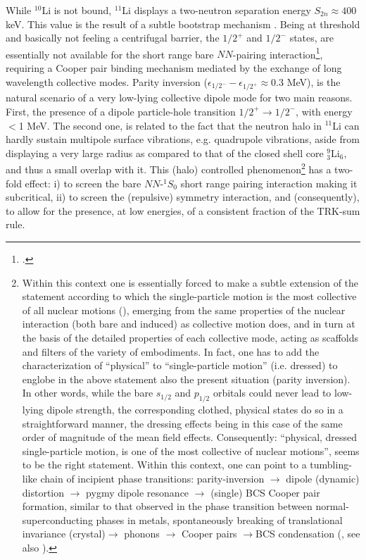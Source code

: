 While $^{10}$Li is not bound, $^{11}$Li displays a two-neutron separation energy $S_{2n}\approx400$ keV.  This value  is the result of a subtle bootstrap mechanism 
. Being at threshold and basically not feeling a centrifugal barrier, the $1/2^+$ and $1/2^-$ states, are essentially not available for the short range bare $NN$-pairing interaction\footnote{\cite{Bennaceur:00,Hamamoto:03,Hamamoto:04}.}, requiring a Cooper pair binding mechanism mediated by  the exchange of  long wavelength collective modes. Parity inversion ($\epsilon_{1/2^-}-\epsilon_{1/2^+}\approx0.3$ MeV), is the natural scenario of a very low-lying collective dipole mode for two main reasons. First, the presence of a dipole particle-hole transition $1/2^+\rightarrow 1/2^-$, with energy  $<$1 MeV. The second one, is related to  the fact that the neutron halo in $^{11}$Li can hardly sustain multipole surface vibrations, e.g. quadrupole vibrations, aside from displaying a very large radius as compared to that of the closed shell core $^9_3$Li$_6$, and thus a small overlap with it. This (halo)  controlled phenomenon\footnote{Within this context one is essentially forced to make a subtle  extension of the statement according to which  the single-particle motion is the most collective  
of all nuclear motions (\cite{Mottelson:62}), emerging from  the same properties  of the nuclear interaction 
(both bare and induced) as collective motion does, 
and in turn at the basis of the detailed properties of each collective mode, acting as
 scaffolds and filters of the variety of embodiments. In fact, one 
has  to add the characterization of ``physical'' to ``single-particle motion'' (i.e. dressed) to englobe in  the above statement 
also the present  situation (parity inversion). In other words, while the bare $s_{1/2}$ and $p_{1/2}$ orbitals could never lead to  low-lying dipole strength, the corresponding 
 clothed, physical states do so in a straightforward manner, the dressing effects being in this case of the same order of magnitude of the mean field effects. Consequently: ``physical,  dressed single-particle motion, is 
 one of the most collective of nuclear  motions'', seems to be  the right statement. Within this context, one can point to a tumbling-like chain of incipient phase transitions: parity-inversion $\to$ dipole (dynamic) distortion $\to$ pygmy dipole resonance $\to$ (single) BCS Cooper pair formation, similar to that observed in the phase transition between normal-superconducting phases in metals, spontaneously breaking of translational invariance (crystal)$\to$ phonons $\to$ Cooper pairs $\to$BCS condensation (\cite{Nambu:91}, see also \cite{Broglia:19}).} has a two-fold effect: i) to screen the bare $NN$-$^1S_0$ short  range pairing interaction making it subcritical, ii) to screen the (repulsive) symmetry interaction, and (consequently), to allow for the presence, at low energies, of a consistent fraction of the TRK-sum rule.


